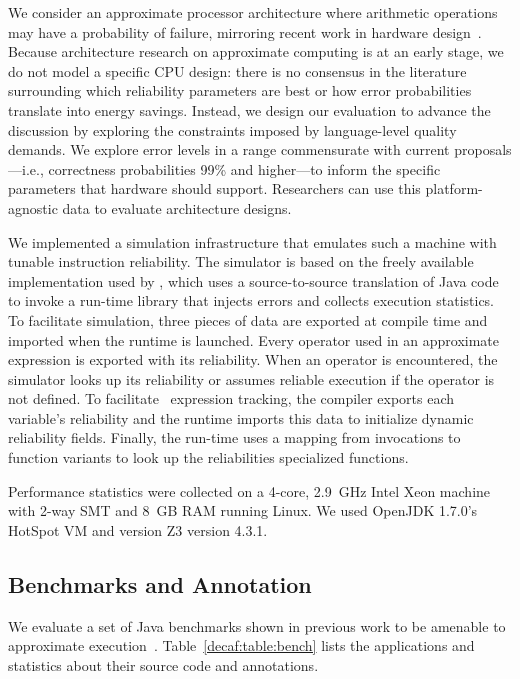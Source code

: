 We consider an approximate processor architecture where arithmetic
operations may have a probability of failure, mirroring recent work in
hardware design~\cite{truffle, quora, kim-hpca, uva-adder}.
Because architecture research on approximate computing is at an early stage,
we do not model a specific CPU design: there is no consensus in the literature
surrounding which reliability parameters are best or how error probabilities
translate into energy savings.
Instead, we design our evaluation to advance the discussion by exploring the
constraints imposed by language-level quality demands.
We explore error levels in a range commensurate with current proposals---i.e.,
correctness probabilities 99\% and higher---to inform the specific parameters
that hardware should support.
Researchers can use this platform-agnostic data to evaluate architecture
designs.

We implemented a simulation
infrastructure that emulates such a machine with tunable instruction
reliability.  The
simulator is based on the freely available implementation used by
\citet{enerj}, which uses a
source-to-source translation of Java code to invoke a run-time library that
injects errors and collects execution statistics.  To facilitate simulation,
three pieces of data are exported at compile time and imported when the runtime
is launched.  Every operator used in an approximate expression is exported with
its reliability.  When an operator is encountered, the simulator looks up its
reliability or assumes reliable execution if the operator is not defined.
To facilitate \Dyn\ expression tracking, the compiler exports each variable's
reliability and the runtime imports this data to initialize dynamic
reliability fields.
Finally, the run-time uses a mapping from invocations to function
variants to look up the reliabilities specialized functions.

Performance statistics were collected on a 4-core, 2.9~GHz Intel Xeon machine
with 2-way SMT and 8~GB RAM running Linux.
We used OpenJDK 1.7.0's HotSpot VM and version Z3 version 4.3.1.

\subsection{Benchmarks and Annotation}

We evaluate a set of Java benchmarks shown in previous work to be amenable to
approximate execution~\cite{enerj, approxstorage}.
Table~\ref{decaf:table:bench} lists the applications and statistics about their
source code and annotations.

